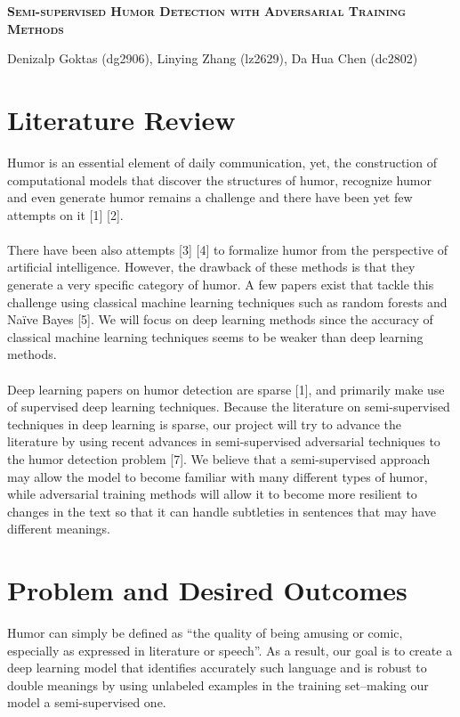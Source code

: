 \documentclass{article}
\author{}
\date{}
\begin{document}
\begin{center}
    \textbf{\LARGE \scshape Semi-supervised Humor Detection with Adversarial Training Methods}
\end{center}
\begin{center}
    Denizalp Goktas (dg2906), Linying Zhang (lz2629), Da Hua Chen (dc2802)
\end{center}

\section{Literature Review}
        Humor is an essential element of daily communication, yet, the construction of computational models that discover the structures of humor, recognize humor and even generate humor remains a challenge and there have been yet few attempts on it [1] [2].\\\\
        There have been also attempts [3] [4] to formalize humor from the perspective of artificial intelligence. However, the drawback of these methods is that they generate a very specific category of humor. A few papers exist that tackle this challenge using classical machine learning techniques such as random forests and Na{\"i}ve Bayes [5]. We will focus on deep learning methods since the accuracy of classical machine learning techniques seems to be weaker than deep learning methods. \\\\
Deep learning papers on humor detection are sparse [1], and primarily make use of supervised deep learning techniques. Because the literature on semi-supervised techniques in deep learning is sparse, our project will try to advance the literature by using recent advances in semi-supervised adversarial techniques to the humor detection problem [7]. We believe that a semi-supervised approach may allow the model to become familiar with many different types of humor, while adversarial training methods will allow it to become more resilient to changes in the text so that it can handle subtleties in sentences that may have different meanings.


\section{Problem and Desired Outcomes}
        Humor can simply be defined as “the quality of being amusing or comic, especially as expressed in literature or speech”. As a result, our goal is to create a deep learning model that identifies accurately such language and is robust to double meanings by using unlabeled examples in the training set–making our model a semi-supervised one.
\end{document}
